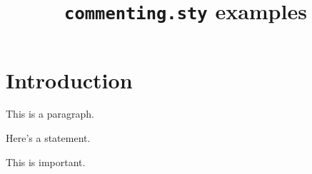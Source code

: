 \documentclass{article}
\title{\texttt{commenting.sty} examples}
\date{}
\begin{document}
\maketitle

\section{Introduction}

This is a paragraph. 

Here's a statement.

\begin{bobenv}
    This is  important.
\end{bobenv}
\end{document}

